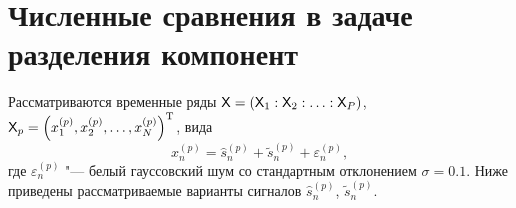 \documentclass[specialist,
    substylefile = spbu.rtx,
    subf,href,colorlinks=true, 12pt]{disser}
\theoremstyle{plain}
\theoremstyle{definition}
\theoremstyle{remark}
\begin{document}


    \section{Численные сравнения в задаче разделения компонент}\label{sec:numerical-comp-sep}
    Рассматриваются временные ряды $\mathsf{X} = \left(\mathsf{X}_1: \mathsf{X}_2: \ldots: \mathsf{X}_P\right)$,
    $\mathsf{X}_p = \left(x_1^{(p)}, x_2^{(p)}, \ldots, x_N^{(p)}\right)^{\mathrm{T}}$, вида
    \begin{equation*}
        x_n^{(p)} = \hat{s}_n^{(p)} + \tilde{s}_n^{(p)} + \varepsilon_n^{(p)},
    \end{equation*}
    где $\varepsilon_n^{(p)}$ "--- белый гауссовский шум со стандартным отклонением $\sigma = 0.1$.
    Ниже приведены рассматриваемые варианты сигналов $\hat{s}_n^{(p)}$, $\tilde{s}_n^{(p)}$.
\end{document}
